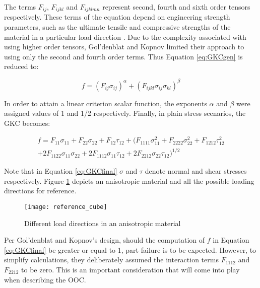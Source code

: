 \documentclass[main.tex]{subfiles}
\begin{document}
The terms $F_{ij}$, $F_{ijkl}$ and $F_{ijklmn}$ represent second, fourth and sixth order tensors respectively. These terms of the equation depend on engineering strength parameters, such as the ultimate tensile and compressive strengths of the material in a particular load direction \cite{Osswald2017a}. Due to the complexity associated with using higher order tensors, Gol'denblat and Kopnov limited their approach to using only the second and fourth order terms. Thus Equation \ref{eq:GKCgen} is reduced to:

\begin{equation} \label{eq:GKCgenTrunc}
f=(F_{ij}\sigma_{ij})^\alpha + (F_{ijkl}\sigma_{ij}\sigma_{kl})^\beta
\end{equation}

In order to attain a linear criterion scalar function, the exponents $\alpha$ and $\beta$ were assigned values of 1 and 1/2 respectively. Finally, in plain stress scenarios, the GKC becomes:

\begin{equation} \label{eq:GKCfinal}
\begin{split}
f=F_{11}\sigma_{11} + F_{22}\sigma_{22} + F_{12}\tau_{12} + (F_{1111}\sigma_{11}^{2} + F_{2222}\sigma_{22}^{2} + F_{1212}\tau_{12}^{2} \\ + 2F_{1122}\sigma_{11}\sigma_{22} + 2F_{1112}\sigma_{11}\tau_{12} + 2F_{2212}\sigma_{22}\tau_{12})^{1/2}
\end{split}
\end{equation}

Note that in Equation \ref{eq:GKCfinal} $\sigma$ and $\tau$ denote normal and shear stresses respectively. Figure \ref{fig:loaddir} depicts an anisotropic material and all the possible loading directions for reference.

\begin{figure}[h]
	\center
	\texttt{[image: reference\_cube]}
	\caption{Different load directions in an anisotropic material} \label{fig:loaddir}
\end{figure}

Per Gol'denblat and Kopnov's design, should the computation of $f$ in Equation \ref{eq:GKCfinal} be greater or equal to 1, part failure is to be expected. However, to simplify calculations, they deliberately assumed the interaction terms $F_{1112}$ and $F_{2212}$ to be zero. This is an important consideration that will come into play when describing the OOC.
\end{document}
